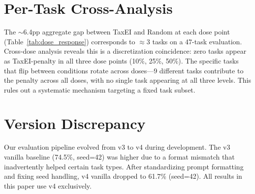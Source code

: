 \section{Per-Task Cross-Analysis}
\label{app:cross_analysis}

The $\sim$6.4pp aggregate gap between TaxEI and Random at each dose point (Table~\ref{tab:dose_response}) corresponds to $\approx$3 tasks on a 47-task evaluation. Cross-dose analysis reveals this is a discretization coincidence: zero tasks appear as TaxEI-penalty in all three dose points (10\%, 25\%, 50\%). The specific tasks that flip between conditions rotate across doses---9 different tasks contribute to the penalty across all doses, with no single task appearing at all three levels. This rules out a systematic mechanism targeting a fixed task subset.

\section{Version Discrepancy}
\label{app:version}

Our evaluation pipeline evolved from v3 to v4 during development. The v3 vanilla baseline (74.5\%, seed=42) was higher due to a format mismatch that inadvertently helped certain task types. After standardizing prompt formatting and fixing seed handling, v4 vanilla dropped to 61.7\% (seed=42). All results in this paper use v4 exclusively.
